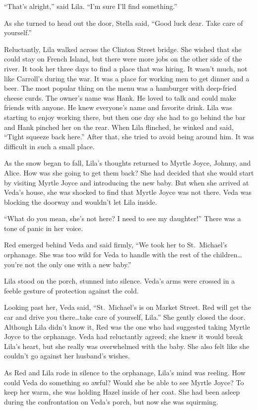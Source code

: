 \documentclass[
  letterpaper,
]{book}
\begin{document}
``That's alright,'' said Lila. ``I'm sure I'll find something.''

As she turned to head out the door, Stella said, ``Good luck dear. Take
care of yourself.''

Reluctantly, Lila walked across the Clinton Street bridge. She wished
that she could stay on French Island, but there were more jobs on the
other side of the river. It took her three days to find a place that was
hiring. It wasn't much, not like Carroll's during the war. It was a
place for working men to get dinner and a beer. The most popular thing
on the menu was a hamburger with deep-fried cheese curds. The owner's
name was Hank. He loved to talk and could make friends with anyone. He
knew everyone's name and favorite drink. Lila was starting to enjoy
working there, but then one day she had to go behind the bar and Hank
pinched her on the rear. When Lila flinched, he winked and said, ``Tight
squeeze back here.'' After that, she tried to avoid being around him. It
was difficult in such a small place.

As the snow began to fall, Lila's thoughts returned to Myrtle Joyce,
Johnny, and Alice. How was she going to get them back? She had decided
that she would start by visiting Myrtle Joyce and introducing the new
baby. But when she arrived at Veda's house, she was shocked to find that
Myrtle Joyce was not there. Veda was blocking the doorway and wouldn't
let Lila inside.

``What do you mean, she's not here? I need to see my daughter!'' There
was a tone of panic in her voice.

Red emerged behind Veda and said firmly, ``We took her to St.~Michael's
orphanage. She was too wild for Veda to handle with the rest of the
children\ldots you're not the only one with a new baby.''

Lila stood on the porch, stunned into silence. Veda's arms were crossed
in a feeble gesture of protection against the cold.

Looking past her, Veda said, ``St.~Michael's is on Market Street. Red
will get the car and drive you there\ldots take care of yourself,
Lila.'' She gently closed the door. Although Lila didn't know it, Red
was the one who had suggested taking Myrtle Joyce to the orphanage. Veda
had reluctantly agreed; she knew it would break Lila's heart, but she
really was overwhelmed with the baby. She also felt like she couldn't go
against her husband's wishes.

As Red and Lila rode in silence to the orphanage, Lila's mind was
reeling. How could Veda do something so awful? Would she be able to see
Myrtle Joyce? To keep her warm, she was holding Hazel inside of her
coat. She had been asleep during the confrontation on Veda's porch, but
now she was squirming.
\end{document}
